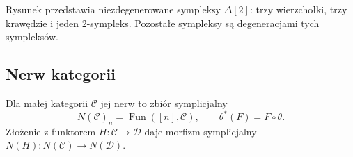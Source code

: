 \begin{center}
\end{center}
Rysunek przedstawia niezdegenerowane sympleksy $\Delta[2]$: trzy wierzchołki, trzy krawędzie i jeden $2$-sympleks. Pozostałe sympleksy są degeneracjami tych sympleksów.

\subsection{Nerw kategorii}

\begin{definicja}[Nerw]\label{cat:def:category-nerve}
Dla małej kategorii $\mathcal C$ jej nerw to zbiór symplicjalny
\[
 N(\mathcal C)_n=\operatorname{Fun}([n],\mathcal C),
 \qquad \theta^*(F)=F\circ\theta.
\]
Złożenie z funktorem $H:\mathcal C\to\mathcal D$ daje morfizm symplicjalny $N(H):N(\mathcal C)\to N(\mathcal D)$.
\end{definicja}


